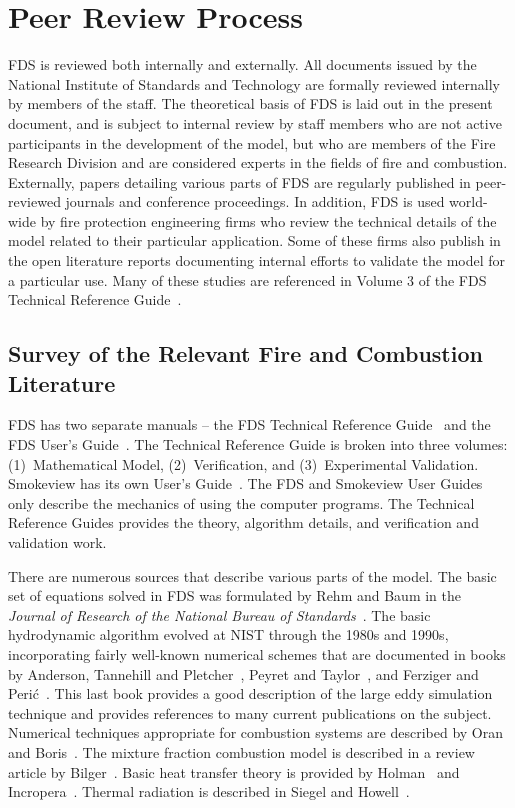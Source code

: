 \documentclass[11pt]{book}
\begin{document}
\chapter{Peer Review Process}

FDS is reviewed both internally and externally. All documents issued by the National Institute of Standards and Technology are formally reviewed
internally by members of the staff. The theoretical basis of FDS is laid out in the present document, and is subject to internal review by staff
members who are not active participants in the development of the model, but who are members of the Fire Research Division and are considered experts
in the fields of fire and combustion. Externally, papers detailing various parts of FDS are regularly published in peer-reviewed journals and
conference proceedings. In addition, FDS is used world-wide by fire protection engineering firms who review the technical details of the model
related to their particular application. Some of these firms also publish in the open literature reports documenting internal efforts to validate the
model for a particular use. Many of these studies are referenced in Volume 3 of the FDS Technical Reference Guide~\cite{FDS_Tech_Guide}.


\section{Survey of the Relevant Fire and Combustion Literature}

\label{Relevantdocs}

FDS has two separate manuals -- the FDS Technical Reference Guide~\cite{FDS_Tech_Guide} and the FDS User's Guide~\cite{FDS_Users_Guide}. The
Technical Reference Guide is broken into three volumes: (1)~Mathematical Model, (2)~Verification, and (3)~Experimental Validation. Smokeview has its
own User's Guide~\cite{Smokeview_Users_Guide}. The FDS and Smokeview User Guides only describe the mechanics of using the computer programs. The
Technical Reference Guides provides the theory, algorithm details, and verification and validation work.

There are numerous sources that describe various parts of the model. The basic set of equations solved in FDS was formulated by Rehm and Baum in the
{\em Journal of Research of the National Bureau of Standards}~\cite{Rehm:1}.  The basic hydrodynamic algorithm evolved at NIST through the 1980s and
1990s, incorporating fairly well-known numerical schemes that are documented in books by Anderson, Tannehill and Pletcher~\cite{Anderson:1}, Peyret
and Taylor~\cite{Peyret:1}, and Ferziger and Peri\'{c}~\cite{Ferziger:1}. This last book provides a good description of the large eddy simulation
technique and provides references to many current publications on the subject.  Numerical techniques appropriate for combustion systems are described
by Oran and Boris~\cite{Oran:1}.  The mixture fraction combustion model is described in a review article by Bilger~\cite{Bilger:AnnRev}. Basic heat
transfer theory is provided by Holman~\cite{Holman:1} and Incropera~\cite{Incropera:1}. Thermal radiation is described in Siegel and
Howell~\cite{Siegel:1}.
\end{document}
